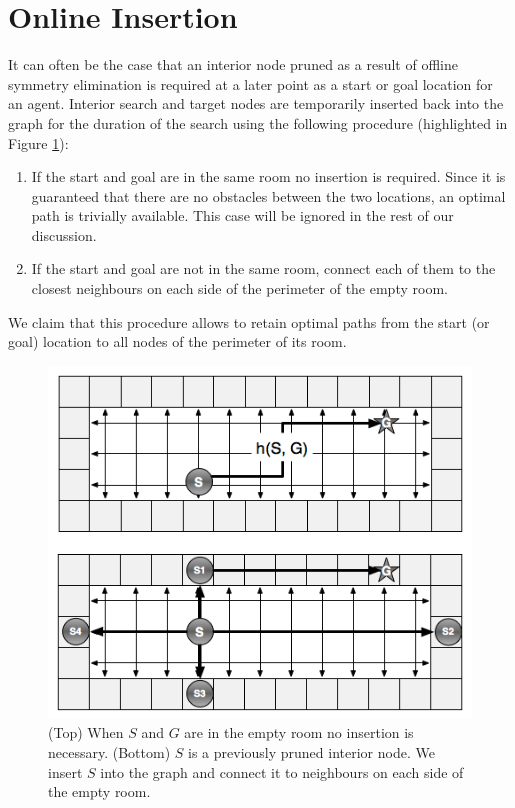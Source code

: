 \section{Online Insertion}
It can often be the case that an interior node pruned as a result of offline symmetry elimination
is required at a later point as a start or goal location for an agent.
Interior search and target nodes are temporarily inserted
back into the graph for the duration of the search using the following procedure (highlighted in Figure \ref{fig:insertion}):
\begin{enumerate}
\item{If the start and goal are in the same room no insertion is required.
 Since it is guaranteed that there are no obstacles between the two locations, an optimal 
 path is trivially available. This case will be ignored in the rest of our discussion.}
\item{If the start and goal are not in the same room, connect each of them
to the closest neighbours on each side of the perimeter of the empty room.}
\end{enumerate}
We claim that this procedure allows to retain optimal paths from the start (or goal) location
to all nodes of the perimeter of its room.

\begin{figure}[t]
	\vspace{-4pt}
       \begin{center}
           \includegraphics[scale=0.50, trim = 10mm 10mm 10mm 0mm]{diagrams/roomtraversal.png}
       \end{center}
	\vspace{-3pt}
       \caption{(Top) When $S$ and $G$ are in the empty room no insertion is necessary.
				(Bottom) $S$ is a previously pruned interior node.
				We insert $S$ into the graph and connect it to neighbours on each side of the empty room.}
	\label{fig:insertion}
\end{figure}

